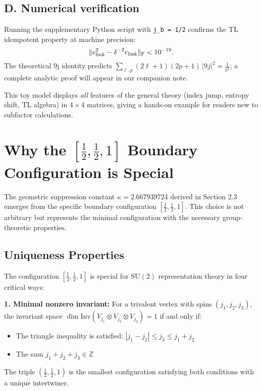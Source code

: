 \documentclass[11pt]{article}
\begin{document}
\subsection*{D. Numerical verification}

Running the supplementary Python script with \texttt{j\_b = 1/2} confirms
the TL idempotent property at machine precision:
\[
  \|e_{\mathrm{link}}^{2}-\delta^{-2}e_{\mathrm{link}}\|_{\rm F} < 10^{-19}.
\]
The theoretical 9j identity predicts
$\sum_{\ell,p}(2\ell\!+\!1)(2p\!+\!1)\,|9j|^{2} = \tfrac{1}{\delta^{2}}$;
a complete analytic proof will appear in our companion note.

\medskip
This toy model displays \emph{all} features of the general theory
(index jump, entropy shift, TL algebra) in $4\times4$ matrices, giving a
hands-on example for readers new to subfactor calculations.

\section{Why the $[\frac{1}{2}, \frac{1}{2}, 1]$ Boundary Configuration is Special}

The geometric suppression constant $\kappa = 2.667939724$ derived in Section 2.3 emerges from the specific boundary configuration $[\frac{1}{2}, \frac{1}{2}, 1]$. This choice is not arbitrary but represents the minimal configuration with the necessary group-theoretic properties.

\subsection{Uniqueness Properties}

The configuration $[\frac{1}{2}, \frac{1}{2}, 1]$ is special for $\mathrm{SU}(2)$ representation theory in four critical ways:

\textbf{1. Minimal nonzero invariant:} For a trivalent vertex with spins $(j_1, j_2, j_3)$, the invariant space $\dim \mathrm{Inv}(V_{j_1} \otimes V_{j_2} \otimes V_{j_3}) = 1$ if and only if:
\begin{itemize}
  \item The triangle inequality is satisfied: $|j_1 - j_2| \leq j_3 \leq j_1 + j_2$
  \item The sum $j_1 + j_2 + j_3 \in \mathbb{Z}$
\end{itemize}
The triple $(\frac{1}{2}, \frac{1}{2}, 1)$ is the smallest configuration satisfying both conditions with a unique intertwiner.
\end{document}
